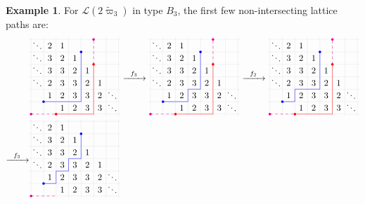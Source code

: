 \documentclass[11pt, leqno]{amsart}
\theoremstyle{plain}
\theoremstyle{definition}
\newtheorem{example}[theorem]{Example}
\numberwithin{equation}{section}
\newcommand{\fw}{\varpi} %
\newcommand{\tfw}{\widetilde{\fw}} %
\newcommand{\mcL}{\mathcal{L}}
\begin{document}
\begin{example}
\label{ex:nilp_crystal}
For $\mcL(2\tfw_3)$ in type $B_3$, the first few non-intersecting lattice paths are:
\begin{align*}
& \begin{tikzpicture}[scale=0.5,baseline=-40]
\board
\fill[blue] (0.5,-4.5) circle (0.1);
\fill[blue] (3.5,-0.5) circle (0.1);
\draw[blue] (0.5,-4.5) -- (3.5,-4.5) -- (3.5,-0.5);
\fill[magenta] (-0.5,-5.5) circle (0.1);
\draw[magenta,dashed] (-0.5,-5.5) -- (1.5,-5.5);
\fill[magenta] (4.5,0.5) circle (0.1);
\draw[magenta,dashed] (4.5,-1.5) -- (4.5,0.5);
\fill[red] (1.5,-5.5) circle (0.1);
\fill[red] (4.5,-1.5) circle (0.1);
\draw[red] (1.5,-5.5) -- (4.5,-5.5) -- (4.5,-1.5);
\end{tikzpicture}
\xrightarrow[\hspace{20pt}]{f_3}
\begin{tikzpicture}[scale=0.5,baseline=-40]
\board
\fill[blue] (0.5,-4.5) circle (0.1);
\fill[blue] (3.5,-0.5) circle (0.1);
\draw[blue] (0.5,-4.5) -- (2.5,-4.5) -- (2.5,-3.5) -- (3.5,-3.5) -- (3.5,-0.5);
\fill[magenta] (-0.5,-5.5) circle (0.1);
\draw[magenta,dashed] (-0.5,-5.5) -- (1.5,-5.5);
\fill[magenta] (4.5,0.5) circle (0.1);
\draw[magenta,dashed] (4.5,-1.5) -- (4.5,0.5);
\fill[red] (1.5,-5.5) circle (0.1);
\fill[red] (4.5,-1.5) circle (0.1);
\draw[red] (1.5,-5.5) -- (4.5,-5.5) -- (4.5,-1.5);
\end{tikzpicture}
\xrightarrow[\hspace{20pt}]{f_2}
\begin{tikzpicture}[scale=0.5,baseline=-40]
\board
\fill[blue] (0.5,-4.5) circle (0.1);
\fill[blue] (3.5,-0.5) circle (0.1);
\draw[blue] (0.5,-4.5) -- (1.5,-4.5) -- (1.5,-3.5) -- (3.5,-3.5) -- (3.5,-0.5);
\fill[magenta] (-0.5,-5.5) circle (0.1);
\draw[magenta,dashed] (-0.5,-5.5) -- (1.5,-5.5);
\fill[magenta] (4.5,0.5) circle (0.1);
\draw[magenta,dashed] (4.5,-1.5) -- (4.5,0.5);
\fill[red] (1.5,-5.5) circle (0.1);
\fill[red] (4.5,-1.5) circle (0.1);
\draw[red] (1.5,-5.5) -- (4.5,-5.5) -- (4.5,-1.5);
\end{tikzpicture}
\\
\xrightarrow[\hspace{20pt}]{f_3} &
\begin{tikzpicture}[scale=0.5,baseline=-40]
\board
\fill[blue] (0.5,-4.5) circle (0.1);
\fill[blue] (3.5,-0.5) circle (0.1);
\draw[blue] (0.5,-4.5) -- (1.5,-4.5) -- (1.5,-3.5) -- (2.5,-3.5) -- (2.5,-2.5) -- (3.5,-2.5) -- (3.5,-0.5);
\fill[magenta] (-0.5,-5.5) circle (0.1);
\draw[magenta,dashed] (-0.5,-5.5) -- (1.5,-5.5);

\end{tikzpicture}
\end{align*}
\end{example}
\end{document}

